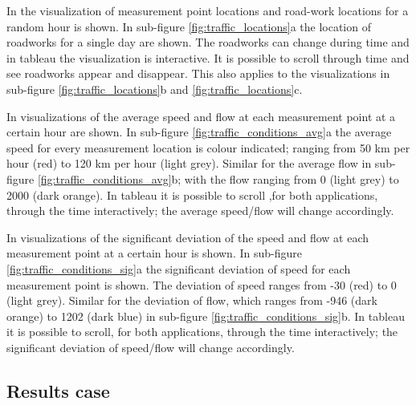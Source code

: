 \documentclass[sigconf]{acmart}
\begin{document}
In  the visualization of measurement point locations and road-work locations for a random hour is shown. In sub-figure \ref{fig:traffic_locations}a the location of roadworks for a single day are shown. The roadworks can change during time and in tableau the visualization is interactive. It is possible to scroll through time and see roadworks appear and disappear. This also applies to the visualizations in sub-figure \ref{fig:traffic_locations}b and \ref{fig:traffic_locations}c.

In  visualizations of the average speed and flow at each measurement point at a certain hour are shown. In sub-figure \ref{fig:traffic_conditions_avg}a the average speed for every measurement location is colour indicated; ranging from 50 km per hour (red) to 120 km per hour (light grey). Similar for the average flow in sub-figure \ref{fig:traffic_conditions_avg}b; with the flow ranging from 0 (light grey) to 2000 (dark orange). In tableau it is possible to scroll ,for both applications, through the time interactively; the average speed/flow will change accordingly.

In  visualizations of the significant deviation of the speed and flow at each measurement point at a certain hour is shown. In  sub-figure \ref{fig:traffic_conditions_sig}a the significant deviation of speed for each measurement point is shown. The deviation of speed ranges from -30 (red) to 0 (light grey). Similar for the deviation of flow, which ranges from -946 (dark orange) to 1202 (dark blue) in  sub-figure \ref{fig:traffic_conditions_sig}b. In tableau it is possible to scroll, for both applications, through the time interactively; the significant deviation of speed/flow will change accordingly.

\subsection{Results case}


\begin{figure*}
    \hfill
    \hfill
    \caption{Traffic conditions in the Amsterdam area at 17:00 - 10/06/16 using averages.}
    \label{fig:traffic_locations}
\end{figure*}
\end{document}
